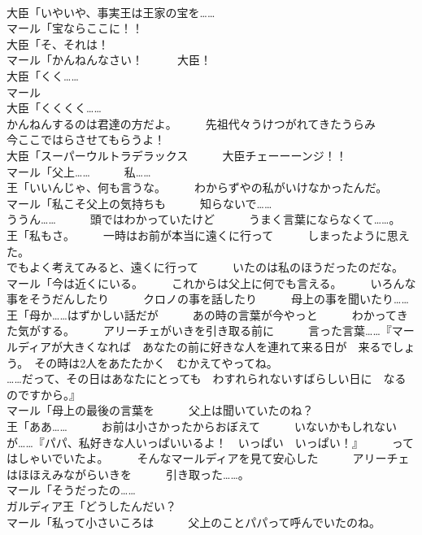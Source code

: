 \documentclass[8pt]{extreport}
\begin{document}
\begin{CJK}{UTF8}{min}
\\	大臣「いやいや、事実王は王家の宝を……	
\\	マール「宝ならここに！！	
\\	大臣「そ、それは！	
\\	マール「かんねんなさい！　　　大臣！	
\\	大臣「くく……	
\\	マール
\\	大臣「くくくく……	
\\	かんねんするのは君達の方だよ。　　　先祖代々うけつがれてきたうらみ　　　今ここではらさせてもらうよ！	
\\	大臣「スーパーウルトラデラックス　　　大臣チェーーーンジ！！	
\\	マール「父上……　　　私……	
\\	王「いいんじゃ、何も言うな。　　　わからずやの私がいけなかったんだ。	
\\	マール「私こそ父上の気持ちも　　　知らないで……	
\\	ううん……　　　頭ではわかっていたけど　　　うまく言葉にならなくて……。	
\\	王「私もさ。　　　一時はお前が本当に遠くに行って　　　しまったように思えた。	
\\	でもよく考えてみると、遠くに行って　　　いたのは私のほうだったのだな。	
\\	マール「今は近くにいる。　　　これからは父上に何でも言える。　　　いろんな事をそうだんしたり　　　クロノの事を話したり　　　母上の事を聞いたり……	
\\	王「母か……はずかしい話だが　　　あの時の言葉が今やっと　　　わかってきた気がする。　　　アリーチェがいきを引き取る前に　　　言った言葉……『マールディアが大きくなれば　あなたの前に好きな人を連れて来る日が　来るでしょう。　その時は2人をあたたかく　むかえてやってね。	
\\	……だって、その日はあなたにとっても　わすれられないすばらしい日に　なるのですから。』	
\\	マール「母上の最後の言葉を　　　父上は聞いていたのね？	
\\	王「ああ……　　　お前は小さかったからおぼえて　　　いないかもしれないが……『パパ、私好きな人いっぱいいるよ！　いっぱい　いっぱい！』　　　ってはしゃいでいたよ。　　　そんなマールディアを見て安心した　　　アリーチェはほほえみながらいきを　　　引き取った……。	
\\	マール「そうだったの……	
\\	ガルディア王「どうしたんだい？	
\\	マール「私って小さいころは　　　父上のことパパって呼んでいたのね。	

\end{CJK}
\end{document}
